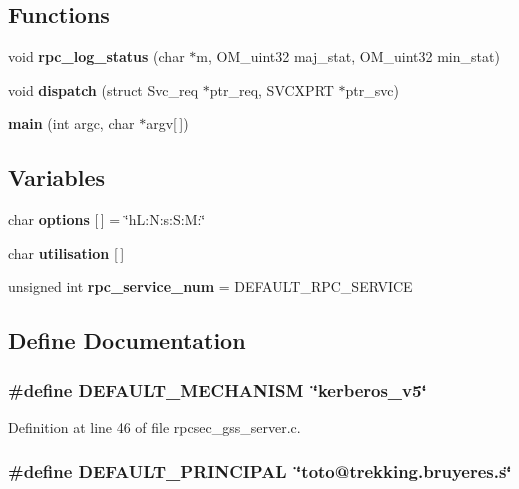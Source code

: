 \subsection*{Functions}
\begin{CompactItemize}
\item 
void {\bf rpc\_\-log\_\-status} (char $\ast$m, OM\_\-uint32 maj\_\-stat, OM\_\-uint32 min\_\-stat)
\item 
void {\bf dispatch} (struct Svc\_\-req $\ast$ptr\_\-req, SVCXPRT $\ast$ptr\_\-svc)
\item 
{\bf main} (int argc, char $\ast$argv[$\,$])
\end{CompactItemize}
\subsection*{Variables}
\begin{CompactItemize}
\item 
char {\bf options} [$\,$] = \char`\"{}h\-L:N:s:S:M:\char`\"{}
\item 
char {\bf utilisation} [$\,$]
\item 
unsigned int {\bf rpc\_\-service\_\-num} = DEFAULT\_\-RPC\_\-SERVICE
\end{CompactItemize}


\subsection{Define Documentation}
\subsubsection{\setlength{\rightskip}{0pt plus 5cm}\#define DEFAULT\_\-MECHANISM\ \char`\"{}kerberos\_\-v5\char`\"{}}\label{rpcsec__gss__server_8c_a9}




Definition at line 46 of file rpcsec\_\-gss\_\-server.c.
\subsubsection{\setlength{\rightskip}{0pt plus 5cm}\#define DEFAULT\_\-PRINCIPAL\ \char`\"{}toto@trekking.bruyeres.s\char`\"{}}\label{rpcsec__gss__server_8c_a10}




